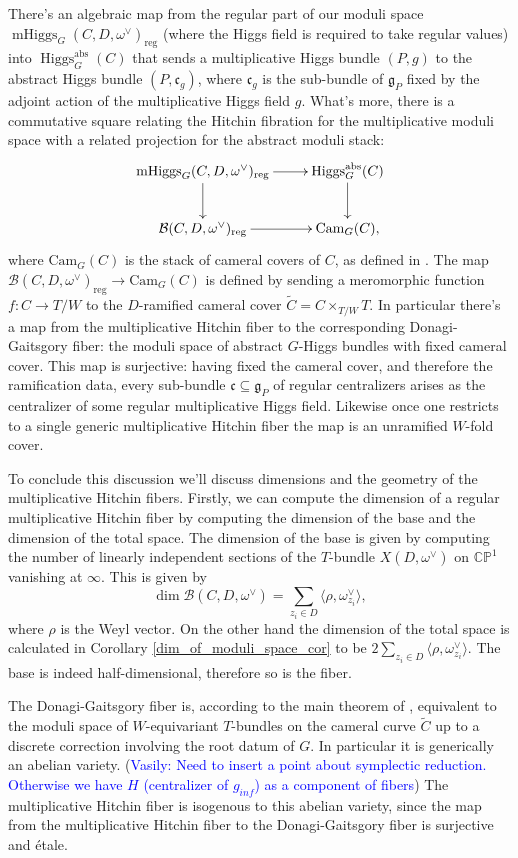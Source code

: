 \documentclass[11pt, oneside, reqno]{amsart}
\theoremstyle{definition} \newtheorem{definition}{Definition}[section]
\theoremstyle{definition} \newtheorem{remark}[definition]{Remark}
\theoremstyle{definition} \newtheorem{remarks}[definition]{Remarks}
\theoremstyle{definition} \newtheorem{question}[definition]{Question}
\theoremstyle{definition} \newtheorem*{note}{Note}
\theoremstyle{definition} \newtheorem{example}[definition]{Example}
\theoremstyle{definition} \newtheorem{examples}[definition]{Examples}
\renewcommand{\gg}{\mathfrak{g}}
\newcommand{\bb}[1]{\mathbb{#1}}
\newcommand{\mr}[1]{\mathrm{#1}}
\newcommand{\mc}[1]{\mathcal{#1}}
\newcommand{\mf}[1]{\mathfrak{#1}}
\newcommand{\wt}[1]{\widetilde{#1}}
\newcommand{\sub}{\subseteq}
\DeclareMathOperator{\higgs}{Higgs}
\DeclareMathOperator{\mhiggs}{mHiggs}
\newcommand{\vasily}[1]{(\textcolor{blue}{Vasily: #1})}
\begin{document}
There's an algebraic map from the regular part of our moduli space $\mhiggs_G(C,D,\omega^\vee)_{\mr{reg}}$ (where the Higgs field is required to take regular values) into $\higgs_G^{\mr{abs}}(C)$ that sends a multiplicative Higgs bundle $(P,g)$ to the abstract Higgs bundle $(P, \mf c_g)$, where $\mf c_g$ is the sub-bundle of $\gg_P$ fixed by the adjoint action of the multiplicative Higgs field $g$.  What's more, there is a commutative square relating the Hitchin fibration for the multiplicative moduli space with a related projection for the abstract moduli stack:
\[\xymatrix{
\mhiggs_G(C,D,\omega^\vee)_{\mr{reg}} \ar[r] \ar[d] &\higgs_G^{\mr{abs}}(C) \ar[d] \\
\mc B(C,D,\omega^\vee)_{\mr{reg}} \ar[r] &\mr{Cam}_G(C),
}\]
where $\mr{Cam}_G(C)$ is the stack of cameral covers of $C$, as defined in \cite[Section 2.8]{DonagiGaitsgory}.  The map $\mc B(C,D,\omega^\vee)_{\mr{reg}} \to \mr{Cam}_G(C)$ is defined by sending a meromorphic function $f \colon C \to T/W$ to the $D$-ramified cameral cover $\wt C = C \times_{T/W} T$.  In particular there's a map from the multiplicative Hitchin fiber to the corresponding Donagi-Gaitsgory fiber: the moduli space of abstract $G$-Higgs bundles with fixed cameral cover.  This map is surjective: having fixed the cameral cover, and therefore the ramification data, every sub-bundle $\mf c \sub \gg_P$ of regular centralizers arises as the centralizer of some regular multiplicative Higgs field.  Likewise once one restricts to a single generic multiplicative Hitchin fiber the map is an unramified $W$-fold cover.

To conclude this discussion we'll discuss dimensions and the geometry of the multiplicative Hitchin fibers.  Firstly, we can compute the dimension of a regular multiplicative Hitchin fiber by computing the dimension of the base and the dimension of the total space.  The dimension of the base is given by computing the number of linearly independent sections of the $T$-bundle $X(D,\omega^\vee)$ on $\bb{CP}^1$ vanishing at $\infty$.  This is given by 
\[\dim \mc B(C,D,\omega^\vee) = \sum_{z_i \in D} \langle \rho, \omega^\vee_{z_i} \rangle,\]
where $\rho$ is the Weyl vector.  On the other hand the dimension of the total space is calculated in Corollary \ref{dim_of_moduli_space_cor} to be $2 \sum_{z_i \in D} \langle \rho, \omega^\vee_{z_i} \rangle$.  The base is indeed half-dimensional, therefore so is the fiber.

The Donagi-Gaitsgory fiber is, according to the main theorem of \cite{DonagiGaitsgory}, equivalent to the moduli space of $W$-equivariant $T$-bundles on the cameral curve $\wt C$ up to a discrete correction involving the root datum of $G$.  In particular it is generically an abelian variety.  \vasily{Need to insert a point about symplectic reduction. Otherwise we have $H$
 (centralizer of $g_{inf}$) as a component of fibers}
The multiplicative Hitchin fiber is isogenous to this abelian variety, since the map from the multiplicative Hitchin fiber to the Donagi-Gaitsgory fiber is surjective and \'etale.
\end{document}
